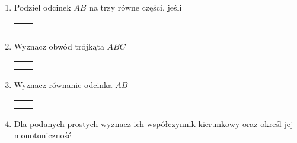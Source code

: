 \documentclass[12pt,a4paper]{article}
\begin{document}
\begin{enumerate}[1.]
 	\item Podziel odcinek $AB$ na trzy równe części, jeśli
 	
 			\begin{enumerate}[a)] \begin{tabular}{p{7cm} p{7cm}}
 			\item $A=(-5,0)$, $B=(4,0)$& \item $A=(1,-5)$, $B=(7,7)$ \\
 			\item $A=(-4,8)$, $B=(2,-1)$& \item $A=(-5,1)$, $B=(3,3)$ \\
 	\end{tabular} \end{enumerate}
 
 	\item Wyznacz obwód trójkąta $ABC$
 	
 	 \begin{enumerate}[a)] \begin{tabular}{p{7cm} p{7.5cm}}
 			\item $A=(1,1)$, $B=(8,2)$, $C=(4,5)$& \item $A=(2,-3)$, $B=(8,-3)$, $C=(11,-8)$ \\
 			\item $A=(0,-1)$, $B=(5,1)$, $C=(2,4)$& \item $A=(-2,-2)$, $B=(3,-1)$, $C=(1,3)$ \\
 	\end{tabular} \end{enumerate}
 
  	\item Wyznacz równanie odcinka $AB$
 
 	\begin{enumerate}[a)] \begin{tabular}{p{7cm} p{7cm}}
 		\item $A=(-4,0)$, $B=(4,0)$& \item $A=(1,-5)$, $B=(7,7)$ \\
 		\item $A=(-4,8)$, $B=(2,-1)$& \item $A=(-5,1)$, $B=(3,3)$ \\
 	\end{tabular} \end{enumerate}
 
 	\newpage
 	\item Dla podanych prostych wyznacz ich współczynnik kierunkowy oraz określ jej monotoniczność
 	

\end{enumerate}
\end{document}
